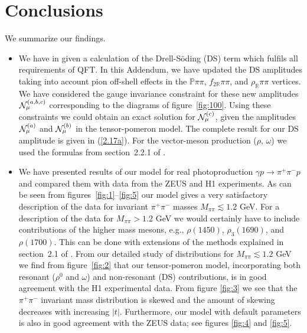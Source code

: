\documentclass[a4paper,11pt]{article}
\newcommand{\Pom}{\mathbb{P}}
\newcommand{\Reg}{\mathbb{R}}
\begin{document}
\section{Conclusions}
\label{sec:4}

We summarize our findings.

\begin{itemize}

\item
We have in \cite{Lebiedowicz:2025xob} given a calculation of 
the Drell-S{\"o}ding (DS) term which fulfils all requirements of QFT.
In this Addendum, we have updated the DS amplitudes taking into account 
pion off-shell effects in the $\Pom \pi \pi$, $f_{2 \Reg} \pi \pi$,
and $\rho_{\Reg} \pi \pi$ vertices.
We have considered the gauge invariance constraint for these new amplitudes
${\cal N}^{(a,b,c)}_{\mu}$
corresponding to the diagrams of figure~\ref{fig:100}.
Using these constraints we could obtain an exact solution for 
${\cal N}^{(c)}_{\mu}$, given the amplitudes 
${\cal N}^{(a)}_{\mu}$ and ${\cal N}^{(b)}_{\mu}$ in the tensor-pomeron model.
The complete result for our DS amplitude is given in (\ref{2.17a}).
For the vector-meson production ($\rho$, $\omega$) we used the formulas from
section~2.2.1 of \cite{Lebiedowicz:2025xob}.

\item
We have presented results of our model 
for real photoproduction $\gamma p \to \pi^{+} \pi^{-} p$
and compared them with data from the ZEUS \cite{ZEUS:1997rof} 
and H1 \cite{H1:2020lzc} experiments.
As can be seen from figures~\ref{fig:1}--\ref{fig:5} our model
gives a very satisfactory description of the data
for invariant $\pi^{+} \pi^{-}$ masses $M_{\pi \pi} \lesssim 1.2$ GeV.
For a description of the data for $M_{\pi \pi} > 1.2$ GeV
we would certainly have to include contributions of the higher mass mesons,
e.g., $\rho(1450)$, $\rho_{3}(1690)$, and $\rho(1700)$.
This can be done with extensions of the methods explained in
section~2.1 of \cite{Bolz:2014mya}.
From our detailed study of distributions for $M_{\pi \pi} \lesssim 1.2$ GeV
we find from figure~\ref{fig:2} that our tensor-pomeron model,
incorporating both resonant ($\rho^{0}$ and $\omega$) 
and non-resonant (DS) contributions,
is in good agreement with the H1 experimental data.
From figure \ref{fig:3} we see that the $\pi^{+}\pi^{-}$ 
invariant mass distribution is skewed 
and the amount of skewing decreases with increasing $|t|$.
Furthermore, our model with default parameters 
is also in good agreement with the ZEUS data;
see figures \ref{fig:4} and \ref{fig:5}.


\end{itemize}
\end{document}
